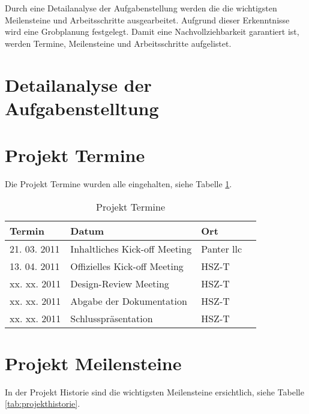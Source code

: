   Durch eine Detailanalyse der Aufgabenstellung werden die die wichtigsten
  Meilensteine und Arbeitsschritte ausgearbeitet. Aufgrund dieser Erkenntnisse
  wird eine Grobplanung festgelegt. Damit eine Nachvollziehbarkeit garantiert
  ist, werden Termine, Meilensteine und Arbeitsschritte aufgelistet.
  
  \section{Detailanalyse der Aufgabenstelltung}
  
  \section{Projekt Termine}
  
  Die Projekt Termine wurden alle eingehalten, siehe Tabelle \ref{tab:termine}.
  \newline
  
  \begin{table}[h]
    \begin{center}
      \begin{tabular}{lp{7cm}ll}
        \toprule
        Termin & Datum & Ort \\
        \midrule
        21. 03. 2011 & Inhaltliches Kick-off Meeting & Panter llc\\
        13. 04. 2011 & Offizielles Kick-off Meeting & HSZ-T\\
        xx. xx. 2011 & Design-Review Meeting & HSZ-T\\
        xx. xx. 2011 & Abgabe der Dokumentation & HSZ-T\\
        xx. xx. 2011 & Schlusspräsentation & HSZ-T\\
        \bottomrule
      \end{tabular}
      \caption{Projekt Termine}
      \label{tab:termine}
    \end{center}
  \end{table}
  
  \section{Projekt Meilensteine}
  
  In der Projekt Historie sind die wichtigsten Meilensteine ersichtlich, siehe
  Tabelle \ref{tab:projekthistorie}.
  \newline
  

